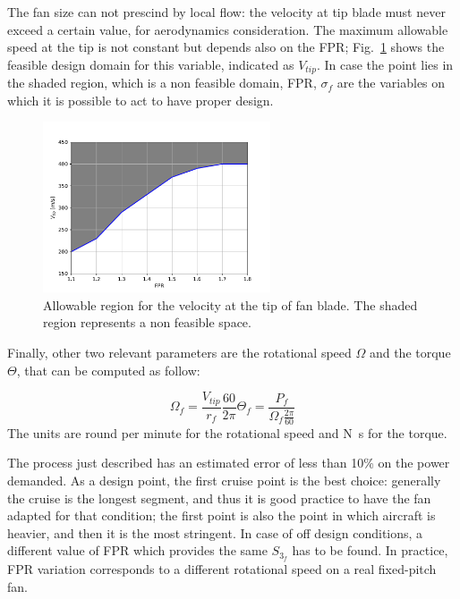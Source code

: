 The fan size can not prescind by local flow: the velocity at tip blade must never exceed a certain value, for aerodynamics consideration. 
The maximum allowable speed at the tip is not constant but depends also on the FPR; Fig.~\ref{fig:vtip_design_space} shows the feasible design domain for this variable, indicated as $V_{tip}$. 
In case the point lies in the shaded region, which is a non feasible domain, FPR, $\sigma_f$ are the variables on which it is possible to act to have proper design. 
\begin{figure}[!h]
	\centering
	\includegraphics[keepaspectratio, width=0.6\textwidth]{images/chap3/vtip_design_space}
	\caption{Allowable region for the velocity at the tip of fan blade. The shaded region represents a non feasible space.}
	\label{fig:vtip_design_space}
\end{figure}

Finally, other two relevant parameters are the rotational speed $\Omega$ and the torque $\Theta$, that can be computed as follow:

\begin{subequations}
	\label{eq:fan_perfo}
	\begin{equation}
		\label{eq:fan_rpm}
		\Omega_{f} = \frac{V_{tip}}{r_{f}}\frac{60}{2\pi}
	\end{equation}
	\begin{equation}
		\label{eq:fan_torque}
		\Theta_{f} = \frac{P_{f}}{\Omega_{f}\frac{2\pi}{60}}
	\end{equation}
\end{subequations}
The units are round per minute for the rotational speed and \si{\newton\second} for the torque. 
  
The process just described has an estimated error of less than 10\% on the power demanded. 
As a design point, the first cruise point is the best choice: generally the cruise is the longest segment, and thus it is good practice to have the fan adapted for that condition; the first point is also the point in which aircraft is heavier, and then it is the most stringent. 
In case of off design conditions, a different value of FPR which provides the same $S_{3_{f}}$ has to be found.
In practice, FPR variation corresponds to a different rotational speed on a real fixed-pitch fan. 

